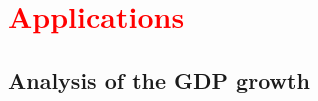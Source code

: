 \documentclass[a4paper,12pt]{article}
\begin{document}
%
%
%


\section{\textcolor{red}{Applications}}\label{sec:app}
\subsection{Analysis of the GDP growth}\label{subsec:app:gdp}
\end{document}
